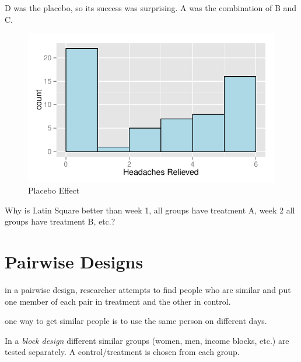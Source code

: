 \documentclass[landscape]{exam}
\begin{document}
  D was the placebo, so its success was surprising.  A was the combination of B
  and C.

  \begin{figure}[H]
    \centering
    \includegraphics[scale = 0.8]{figures/placebo.pdf}
    \caption{Placebo Effect}\label{fig:placebo}
  \end{figure}

  Why is Latin Square better than week 1, all groups have treatment A, week 2
  all groups have treatment B, etc.?


  \section{Pairwise Designs}

  \begin{itemize*}
    \item in a pairwise design, researcher attempts to find people who are
      similar and put one member of each pair in treatment and the other in
      control.

    \item one way to get similar people is to use the same person on different
      days.

    \item In a {\em block design\/} different similar groups (women, men, income
      blocks, etc.) are tested separately.  A control/treatment is chosen from
      each group.  
  \end{itemize*}
\end{document}
